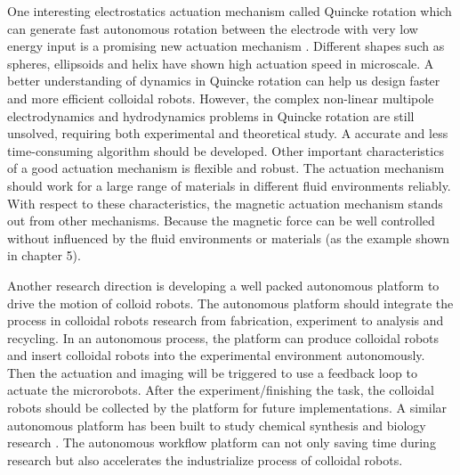 One interesting electrostatics actuation mechanism called Quincke rotation which can generate fast autonomous rotation between the electrode with very low energy input is a promising new actuation mechanism \autocite{das2013electrohydrodynamic}. Different shapes such as spheres, ellipsoids and helix have shown high actuation speed in microscale\autocite{brosseau2019relating,das2019active}. A better understanding of dynamics in Quincke rotation can help us design faster and more efficient colloidal robots. However, the complex non-linear multipole electrodynamics and hydrodynamics problems in Quincke rotation are still unsolved, requiring  both experimental and theoretical study. A accurate  and  less time-consuming algorithm should be developed\autocite{fiore2019fast}. Other important characteristics of a good actuation mechanism  is flexible and robust. The actuation mechanism should work for a large range of materials in different fluid environments reliably. With respect to these characteristics,  the magnetic actuation mechanism stands out from other mechanisms. Because the magnetic force can be well controlled without influenced by the fluid environments or materials (as the example shown in chapter 5).

Another research direction is developing a well packed autonomous platform to drive the motion of colloid  robots.  The autonomous platform should integrate the process in colloidal robots research from fabrication, experiment to analysis and recycling. In an autonomous process, the platform can produce colloidal robots and insert colloidal robots into the experimental environment autonomously. Then the actuation and imaging will be triggered to  use a feedback loop to actuate the microrobots. After the experiment/finishing the task, the colloidal robots should be collected by the platform for future implementations. A similar autonomous platform has been built to study chemical synthesis and biology research \autocite{grizou2020curious,chao2019systems}. The autonomous workflow platform can not only saving time during research but also accelerates the industrialize process of colloidal robots.   

